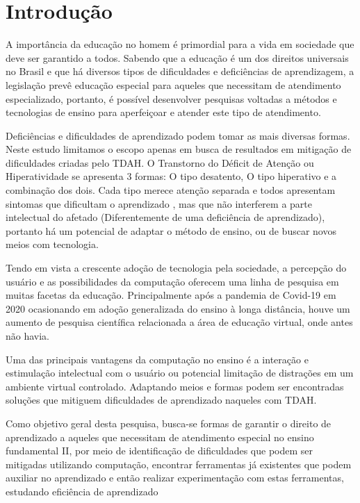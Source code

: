 
\chapter{Introdução}

A importância da educação no homem é primordial para a vida em sociedade que deve ser garantido a todos. Sabendo que a educação é um dos direitos universais no Brasil e que há diversos tipos de dificuldades e deficiências de aprendizagem, a legislação prevê educação especial para aqueles que necessitam de atendimento especializado, portanto, é possível desenvolver  pesquisas voltadas a métodos e tecnologias de ensino para aperfeiçoar e atender este tipo de atendimento.

Deficiências e dificuldades de aprendizado podem tomar as mais diversas formas. Neste estudo limitamos o escopo apenas em busca de resultados em mitigação de dificuldades criadas pelo TDAH. O Transtorno do Déficit de Atenção ou Hiperatividade se apresenta 3 formas: O tipo desatento, O tipo hiperativo e a combinação dos dois. Cada tipo merece atenção separada e todos apresentam sintomas que dificultam o aprendizado \cite{okuyama}, mas que  não interferem a parte intelectual do afetado (Diferentemente de uma deficiência de aprendizado), portanto há um potencial de adaptar o método de ensino, ou de buscar novos meios com tecnologia.

Tendo em vista a crescente adoção de tecnologia pela sociedade, a percepção do usuário e as possibilidades da computação oferecem uma linha de pesquisa em muitas facetas da educação. Principalmente após a pandemia de Covid-19 em 2020 ocasionando em adoção generalizada do ensino à longa distância, houve um aumento de pesquisa científica relacionada a área de educação virtual, onde antes não havia. 

Uma das principais vantagens da computação no ensino é a interação e estimulação intelectual com o usuário ou potencial limitação de distrações em um ambiente virtual controlado. Adaptando meios e formas podem ser encontradas soluções que mitiguem dificuldades de aprendizado naqueles com TDAH.

Como objetivo geral desta pesquisa, busca-se formas de garantir o direito de aprendizado a aqueles que necessitam de atendimento especial no ensino fundamental II, por meio de identificação de dificuldades que podem ser mitigadas utilizando computação, encontrar ferramentas já existentes que podem auxiliar no aprendizado e então realizar experimentação com estas ferramentas, estudando eficiência de aprendizado
